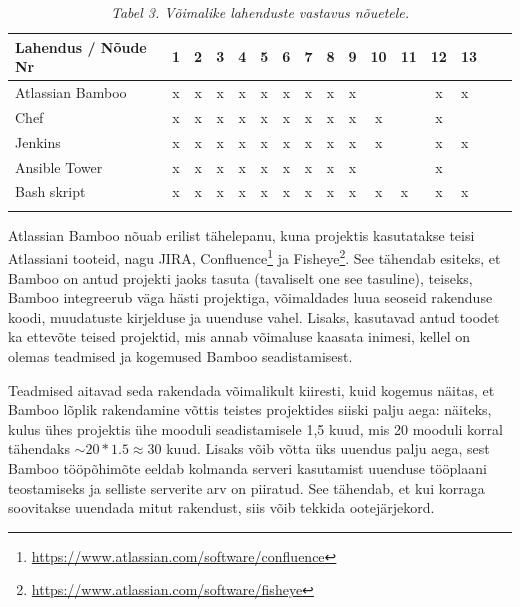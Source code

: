\documentclass[12pt]{article}
\begin{document}
  \begin{table}[H]
    \caption*{\textit{Tabel 3. Võimalike lahenduste vastavus nõuetele.}}
    
    \begin{tabular}{ |l|c|c|c|c|c|c|c|c|c|c V{4} c V{4} c|c| }
      \hline
      \textbf{Lahendus / Nõude Nr} & \textbf{1} & \textbf{2} & \textbf{3} & \textbf{4} & \textbf{5} & \textbf{6} & \textbf{7} & \textbf{8} & \textbf{9} & \textbf{10} & \textbf{11} & \textbf{12} & \textbf{13}\\
      \hline
      Atlassian Bamboo & x & x & x & x & x & x & x & x & x & & & x & x\\
      \hline
      Chef & x & x & x & x & x & x & x & x & x & x & & x &\\
      \hline
      Jenkins & x & x & x & x & x & x & x & x & x & x & & x & x\\
      \hline
      Ansible Tower & x & x & x & x & x & x & x & x & x & & & x & \\
      \hline
      Bash skript & x & x & x & x & x & x & x & x & x & x & x & x & x\\
      \hline
    \end{tabular}
  \end{table}

  Atlassian Bamboo nõuab erilist tähelepanu, kuna projektis kasutatakse teisi Atlassiani tooteid, nagu JIRA, Confluence\footnote{\url{https://www.atlassian.com/software/confluence}} ja Fisheye\footnote{\url{https://www.atlassian.com/software/fisheye}}. See tähendab esiteks, et Bamboo on antud projekti jaoks tasuta (tavaliselt one see tasuline), teiseks, Bamboo integreerub väga hästi projektiga, võimaldades luua seoseid rakenduse koodi, muudatuste kirjelduse ja uuenduse vahel. Lisaks, kasutavad antud toodet ka ettevõte teised projektid, mis annab võimaluse kaasata inimesi, kellel on olemas teadmised ja kogemused Bamboo seadistamisest.
  
  Teadmised aitavad seda rakendada võimalikult kiiresti, kuid kogemus näitas, et Bamboo lõplik rakendamine võttis teistes projektides siiski palju aega: näiteks, kulus ühes projektis ühe mooduli seadistamisele 1,5 kuud, mis 20 mooduli korral tähendaks $\sim20*1.5 \approx 30$ kuud. Lisaks võib võtta üks uuendus palju aega, sest Bamboo tööpõhimõte eeldab kolmanda serveri kasutamist uuenduse tööplaani teostamiseks ja selliste serverite arv on piiratud. See tähendab, et kui korraga soovitakse uuendada mitut rakendust, siis võib tekkida ootejärjekord.
  
\end{document}
